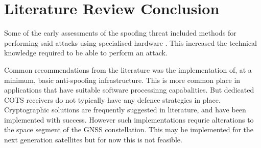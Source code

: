 \renewcommand{\arraystretch}{1.2}
\begin{table}[!ht]
    \begin{center}
        \caption{Summary of Spoofing Mitigation Methods from \cite{RN6}}
        \label{tab:SpoofMitigateSum}
    \end{center}
\end{table}
\renewcommand{\arraystretch}{1}


\section{Literature Review Conclusion}
Some of the early assessments of the spoofing threat included methods for performing said attacks using specialised hardware \cite{RN23}. This increased the technical
knowledge required to be able to perform an attack.

Common recommendations from the literature was the implementation of, at a minimum, basic anti-spoofing infrastructure. This is more common place in applications that
have suitable software processinng capabalities. But dedicated COTS receivers do not typically have any defence strategies in place.
Cryptographic solutions are frequently suggested in literature, and have been implemented with success. However such implementations requrie alterations to the space
segment of the GNSS constellation. This may be implemented for the next generation satellites but for now this is not feasible. 

